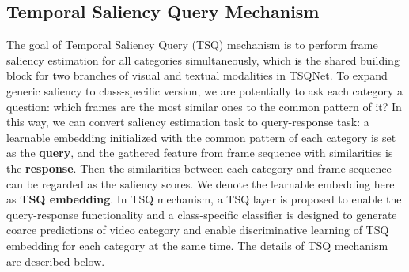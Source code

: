 \documentclass[runningheads]{llncs}
\begin{document}
\subsection{Temporal Saliency Query Mechanism}\label{tsq_mechanisim}
The goal of Temporal Saliency Query (TSQ) mechanism is to perform frame saliency estimation for all categories simultaneously, which is the shared building block for two branches of visual and textual modalities in TSQNet. To expand generic saliency to class-specific version, we are potentially to ask each category a question: 
which frames are the most similar ones to the common pattern of it?
In this way, we can convert saliency estimation task to query-response task: a learnable embedding initialized with the common pattern of each category is set as the \textbf{query}, and the gathered feature from frame sequence with similarities is the \textbf{response}. Then the similarities between each category and frame sequence can be regarded as the saliency scores. We denote the learnable embedding here as \textbf{TSQ embedding}. In TSQ mechanism, a TSQ layer is proposed to enable the query-response functionality and a class-specific classifier is designed to generate coarce predictions of video category and enable discriminative learning of TSQ embedding for each category at the same time. The details of TSQ mechanism are described below.
\end{document}

